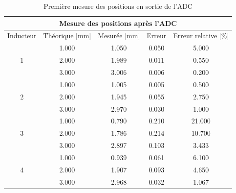 \begin{table}[H]
    \centering
    \begin{tabular}{|c|c|c|c|c|}
        \hline
        \multicolumn{5}{|c|}{\textbf{Mesure des positions après l'ADC}}                                \\ \hline
        Inducteur          & Théorique {[}mm{]} & Mesurée {[}mm{]} & Erreur & Erreur relative {[}\%{]} \\ \hline
        \multirow{3}{*}{1} & 1.000              & 1.050            & 0.050  & 5.000                    \\ \cline{2-5}
                           & 2.000              & 1.989            & 0.011  & 0.550                    \\ \cline{2-5}
                           & 3.000              & 3.006            & 0.006  & 0.200                    \\ \hline
        \multirow{3}{*}{2} & 1.000              & 1.005            & 0.005  & 0.500                    \\ \cline{2-5}
                           & 2.000              & 1.945            & 0.055  & 2.750                    \\ \cline{2-5}
                           & 3.000              & 2.970            & 0.030  & 1.000                    \\ \hline
        \multirow{3}{*}{3} & 1.000              & 0.790            & 0.210  & 21.000                   \\ \cline{2-5}
                           & 2.000              & 1.786            & 0.214  & 10.700                   \\ \cline{2-5}
                           & 3.000              & 2.897            & 0.103  & 3.433                    \\ \hline
        \multirow{3}{*}{4} & 1.000              & 0.939            & 0.061  & 6.100                    \\ \cline{2-5}
                           & 2.000              & 1.907            & 0.093  & 4.650                    \\ \cline{2-5}
                           & 3.000              & 2.968            & 0.032  & 1.067                    \\ \hline
    \end{tabular}
    \caption{Première mesure des positions en sortie de l'ADC}
    \label{tab:premier_mesure_pos_adc}
\end{table}

